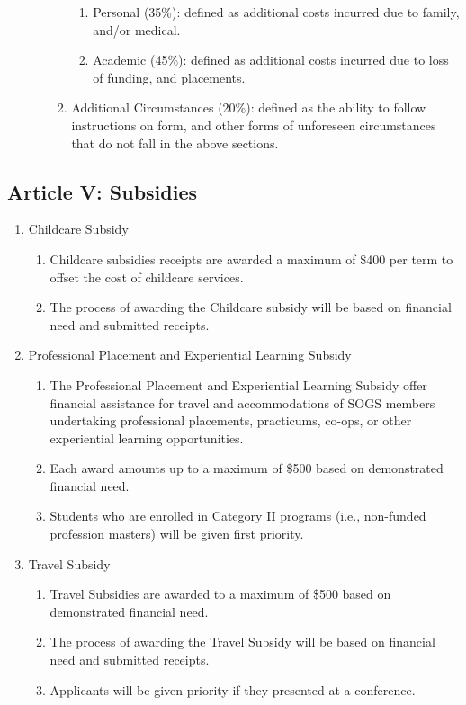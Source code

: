 \begin{enumerate}[label*=\arabic*., align=left]
\begin{enumerate}[label*=\arabic*., align=left]
\begin{enumerate}[label*=\arabic*., align=left]
\begin{enumerate}[label*=\arabic*., align=left]
\item Personal (35\%): defined as additional costs incurred due to family, and/or medical.
\item Academic (45\%): defined as additional costs incurred due to loss of funding, and placements.
\end{enumerate}
\item Additional Circumstances (20\%): defined as the ability to follow instructions on form, and other forms of unforeseen circumstances that do not fall in the above sections.
\end{enumerate}
\end{enumerate}
\end{enumerate}

\subsection{Article V: Subsidies}
\begin{enumerate}[label*=\arabic*., align=left]	
\item Childcare Subsidy
\begin{enumerate}[label*=\arabic*., align=left]	
\item Childcare subsidies receipts are awarded a maximum of \$400 per term to offset the cost of childcare services.
\item The process of awarding the Childcare subsidy will be based on financial need and submitted receipts.
\end{enumerate}
\item Professional Placement and Experiential Learning Subsidy
\begin{enumerate}[label*=\arabic*., align=left]	
\item The Professional Placement and Experiential Learning Subsidy offer financial assistance for travel and accommodations of SOGS members undertaking professional placements, practicums, co-ops, or other experiential learning opportunities. 
\item Each award amounts up to a maximum of \$500 based on demonstrated financial need.
\item Students who are enrolled in Category II programs (i.e., non-funded profession masters) will be given first priority.
\end{enumerate}
\item Travel Subsidy
\begin{enumerate}[label*=\arabic*., align=left]	
\item Travel Subsidies are awarded to a maximum of \$500 based on demonstrated financial need.
\item The process of awarding the Travel Subsidy will be based on financial need and submitted receipts.
\item Applicants will be given priority if they presented at a conference.
\end{enumerate}
\end{enumerate}